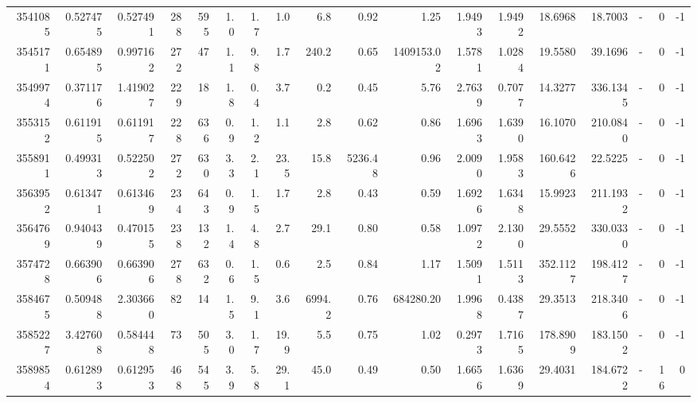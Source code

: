 \begin{tabular}{rrrrrrrrrrrrrrrlrr}
   3541085 & 0.527475 &   0.527491 &  288 &  595 &      1.0 &      1.7 &     1.0 &      6.8 &       0.92 &        1.25 &  1.9493 &  1.9492 &   18.6968 &   18.7003 &             - &        0 &         -1 \\
   3545171 & 0.654895 &   0.997162 &  272 &   47 &      1.1 &      9.8 &     1.7 &    240.2 &       0.65 &  1409153.02 &  1.5781 &  1.0284 &   19.5580 &   39.1696 &             - &        0 &         -1 \\
   3549974 & 0.371176 &   1.419027 &  229 &   18 &      1.8 &      0.4 &     3.7 &      0.2 &       0.45 &        5.76 &  2.7639 &  0.7077 &   14.3277 &  336.1345 &             - &        0 &         -1 \\
   3553152 & 0.611915 &   0.611917 &  228 &  636 &      0.9 &      1.2 &     1.1 &      2.8 &       0.62 &        0.86 &  1.6963 &  1.6390 &   16.1070 &  210.0840 &             - &        0 &         -1 \\
   3558911 & 0.499313 &   0.522502 &  272 &  630 &      3.3 &      2.1 &    23.5 &     15.8 &    5236.48 &        0.96 &  2.0090 &  1.9583 &  160.6426 &   22.5225 &             - &        0 &         -1 \\
   3563952 & 0.613471 &   0.613469 &  234 &  643 &      0.9 &      1.5 &     1.7 &      2.8 &       0.43 &        0.59 &  1.6926 &  1.6348 &   15.9923 &  211.1932 &             - &        0 &         -1 \\
   3564769 & 0.940439 &   0.470155 &  238 &  132 &      1.4 &      4.8 &     2.7 &     29.1 &       0.80 &        0.58 &  1.0972 &  2.1300 &   29.5552 &  330.0330 &             - &        0 &         -1 \\
   3574728 & 0.663906 &   0.663906 &  278 &  632 &      0.6 &      1.5 &     0.6 &      2.5 &       0.84 &        1.17 &  1.5091 &  1.5113 &  352.1127 &  198.4127 &             - &        0 &         -1 \\
   3584675 & 0.509488 &   2.303660 &   82 &   14 &      1.5 &      9.1 &     3.6 &   6994.2 &       0.76 &   684280.20 &  1.9968 &  0.4387 &   29.3513 &  218.3406 &             - &        0 &         -1 \\
   3585227 & 3.427608 &   0.584448 &   73 &  505 &      3.0 &      1.7 &    19.9 &      5.5 &       0.75 &        1.02 &  0.2973 &  1.7165 &  178.8909 &  183.1502 &             - &        0 &         -1 \\
   3589854 & 0.612893 &   0.612953 &  468 &  545 &      3.9 &      5.8 &    29.1 &     45.0 &       0.49 &        0.50 &  1.6656 &  1.6369 &   29.4031 &  184.6722 &             - &       16 &          0 \\

\end{tabular}
